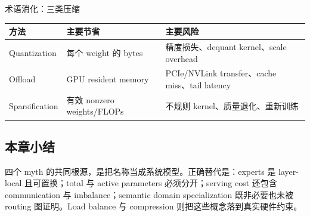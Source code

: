 \begin{knowledgebox}{术语消化：三类压缩}
\begin{tabularx}{\textwidth}{L{0.18\textwidth} L{0.24\textwidth} X}
\toprule
方法 & 主要节省 & 主要风险 \\
\midrule
Quantization & 每个 weight 的 bytes & 精度损失、dequant kernel、scale overhead \\
Offload & GPU resident memory & PCIe/NVLink transfer、cache miss、tail latency \\
Sparsification & 有效 nonzero weights/FLOPs & 不规则 kernel、质量退化、重新训练 \\
\bottomrule
\end{tabularx}
\end{knowledgebox}


\subsection{本章小结}

四个 myth 的共同根源，是把名称当成系统模型。正确替代是：experts 是 layer-local 且可置换；total 与 active parameters 必须分开；serving cost 还包含 communication 与 imbalance；semantic domain specialization 既非必要也未被 routing 图证明。Load balance 与 compression 则把这些概念落到真实硬件约束。

